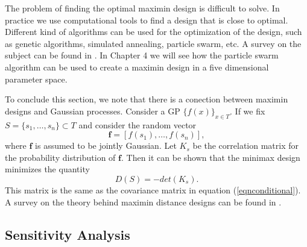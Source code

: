 \documentclass[12pt]{book}
\begin{document}
The problem of finding
the optimal  maximin design is difficult to solve. In practice we use computational tools
to find a design that is close to optimal.  Different kind of algorithms can be used for the optimization
of the design, such as genetic algorithms, simulated annealing, particle swarm, etc. A survey
on the subject  can be found in 
\cite{viana2010algorithm}. In Chapter 4 we will see how  the particle swarm algorithm can be used to 
create a maximin design in a five dimensional parameter space.

To conclude this section, we note that there is a conection between maximin designs and Gaussian processes. 
Consider a
GP $\{f(x)\}_{x\in T}$. If we fix $S=\{s_{1},\ldots,s_{n}\}\subset T$  and consider the random vector
\begin{equation*}
\textbf{f}=[f(s_{1}),\ldots,f(s_{n})],
\end{equation*}
where $\textbf{f}$ is assumed to be jointly Gaussian. Let $K_{s}$ be 
the correlation matrix for the probability distribution of $\textbf{f}$. Then it can be shown
that the minimax design minimizes the quantity 
\begin{equation*}
D(S)=-det(K_{s}).
\end{equation*}
This matrix is the same as the covariance matrix in equation (\ref{eqnconditional}).
A survey on the theory behind maximin distance designs can be found in \cite{johnson1990minimax}.
\newline




\subsection{Sensitivity Analysis}
\end{document}
